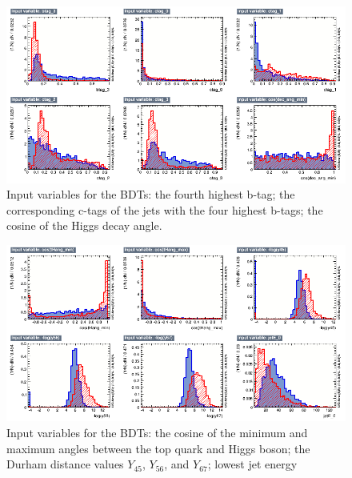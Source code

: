 \begin{figure}[p]
	\centering
	\includegraphics[width=1.0\textwidth]{../Pictures/Analysis/BDTs/variables_id_c3.png}
	\caption{Input variables for the BDTs: the fourth highest b-tag; the corresponding c-tags of the jets with the four highest b-tags; the cosine of the Higgs decay angle.}
	\label{figure:analysis/results/tmva-inputs-3}
\end{figure}

\begin{figure}[p]
	\centering
	\includegraphics[width=1.0\textwidth]{../Pictures/Analysis/BDTs/variables_id_c4.png}
	\caption{Input variables for the BDTs: the cosine of the minimum and maximum angles between the top quark and Higgs boson; the Durham distance values $Y_{45}$, $Y_{56}$, and $Y_{67}$; lowest jet energy}
	\label{figure:analysis/results/tmva-inputs-4}
\end{figure}

